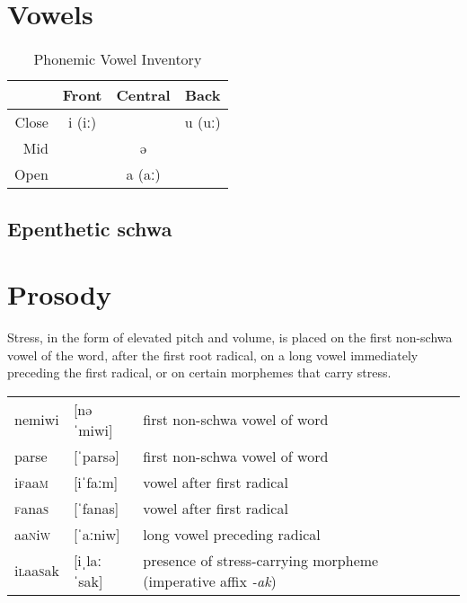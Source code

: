 \documentclass[a4paper,10pt,twoside,openright]{memoir}
\newcommand{\longv}{ː}
\newcommand{\famword}[5]{#1\textsc{#2}#3\textsc{#4}#5}
\begin{document}
\section{Vowels}

\begin{table}[ht]
    \centering
    \begin{tabular}{rccc}
    \toprule
          & Front & Central & Back \\
    \midrule
    Close & i (i\longv{}) & & u (u\longv) \\
    Mid   & & ə & \\
    Open  & & a (a\longv) & \\
    \bottomrule
    \end{tabular}
    \caption{Phonemic Vowel Inventory}
    \label{tab:vowelinv}
\end{table}

\subsection{Epenthetic schwa}

\section{Prosody}

Stress, in the form of elevated pitch and volume, is placed on the first non-schwa vowel of the word, after the first root radical, on a long vowel immediately preceding the first radical, or on certain morphemes that carry stress.

\begin{table}[ht]
    \centering
    \begin{tabular}{lll}
        nemiwi & [nəˈmiwi] & first non-schwa vowel of word\\
        parse & [ˈparsə] & first non-schwa vowel of word\\
        \famword{i}{f}{aa}{m}{} & [iˈfa{\longv}m] & vowel after first radical\\
        \famword{}{f}{ana}{s}{} & [ˈfanas] & vowel after first radical\\
        \famword{aa}{n}{i}{w}{} & [ˈa{\longv}niw] & long vowel preceding radical\\
        \famword{i}{l}{aa}{s}{}ak & [iˌla{\longv}ˈsak] & presence of stress-carrying morpheme (imperative affix \emph{-ak})
    \end{tabular}
\end{table}
\end{document}
